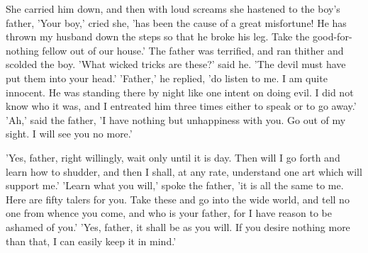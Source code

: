 \documentclass[12pt]{book}
\begin{document}
She carried him down, and then with loud screams she hastened to the
boy's father, 'Your boy,' cried she, 'has been the cause of a great
misfortune! He has thrown my husband down the steps so that he broke
his leg. Take the good-for-nothing fellow out of our house.' The
father was terrified, and ran thither and scolded the boy. 'What
wicked tricks are these?' said he. 'The devil must have put them into
your head.' 'Father,' he replied, 'do listen to me. I am quite
innocent. He was standing there by night like one intent on doing
evil. I did not know who it was, and I entreated him three times
either to speak or to go away.' 'Ah,' said the father, 'I have nothing
but unhappiness with you. Go out of my sight. I will see you no more.'

'Yes, father, right willingly, wait only until it is day. Then will I
go forth and learn how to shudder, and then I shall, at any rate,
understand one art which will support me.' 'Learn what you will,'
spoke the father, 'it is all the same to me. Here are fifty talers for
you. Take these and go into the wide world, and tell no one from
whence you come, and who is your father, for I have reason to be
ashamed of you.' 'Yes, father, it shall be as you will. If you desire
nothing more than that, I can easily keep it in mind.'
\end{document}
